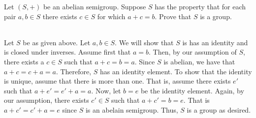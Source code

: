 Let $(S,+)$ be an abelian semigroup. Suppose $S$ has the property that for each pair $a,b\in S$ there exists $c\in S$ 
for which $a+c=b$. Prove that $S$ is a group.\\

\begin{solution}\renewcommand{\qedsymbol}{}\ \\
    Let $S$ be as given above. Let $a,b\in S$. We will show that $S$ is has an identity and is closed under inverses. Assume 
    first that $a=b$. Then, by our assumption of $S$, there exists a $c\in S$ such that $a+c=b=a$. Since $S$ is abelian, we 
    have that $a+c=c+a=a$. Therefore, $S$ has an identity element. To show that the identity is unique, assume that there is 
    more than one. That is, assume there exists $e'$ such that $a+e'=e'+a=a$. Now, let $b=e$ be the identity element. Again, 
    by our assumption, there exists $c'\in S$ such that $a+c'=b=e$. That is $a+c'=c'+a=e$ since $S$ is an abelain semigroup. 
    Thus, $S$ is a group as desired.
\end{solution}